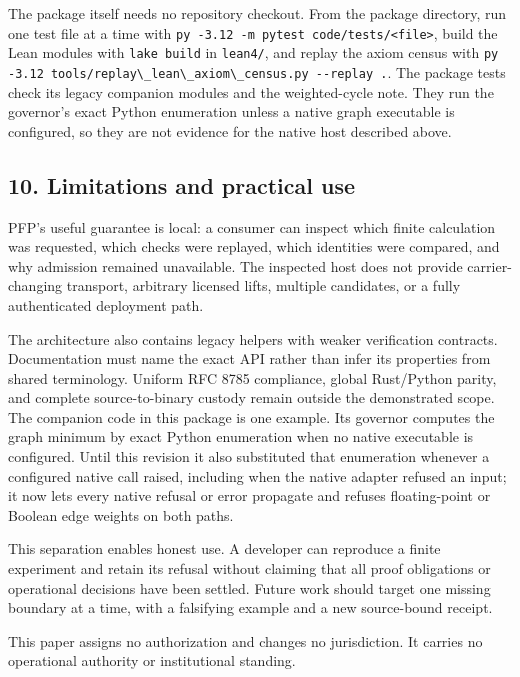 \documentclass[
  11pt,
]{article}
\newcommand{\passthrough}[1]{#1}
\begin{document}
The package itself needs no repository checkout. From the package
directory, run one test file at a time with
\passthrough{\lstinline!py -3.12 -m pytest code/tests/<file>!}, build
the Lean modules with \passthrough{\lstinline!lake build!} in
\passthrough{\lstinline!lean4/!}, and replay the axiom census with
\passthrough{\lstinline!py -3.12 tools/replay\_lean\_axiom\_census.py --replay .!}.
The package tests check its legacy companion modules and the
weighted-cycle note. They run the governor's exact Python enumeration
unless a native graph executable is configured, so they are not evidence
for the native host described above.

\subsection{10. Limitations and practical
use}\label{limitations-and-practical-use}

PFP's useful guarantee is local: a consumer can inspect which finite
calculation was requested, which checks were replayed, which identities
were compared, and why admission remained unavailable. The inspected
host does not provide carrier-changing transport, arbitrary licensed
lifts, multiple candidates, or a fully authenticated deployment path.

The architecture also contains legacy helpers with weaker verification
contracts. Documentation must name the exact API rather than infer its
properties from shared terminology. Uniform RFC 8785 compliance, global
Rust/Python parity, and complete source-to-binary custody remain outside
the demonstrated scope. The companion code in this package is one
example. Its governor computes the graph minimum by exact Python
enumeration when no native executable is configured. Until this revision
it also substituted that enumeration whenever a configured native call
raised, including when the native adapter refused an input; it now lets
every native refusal or error propagate and refuses floating-point or
Boolean edge weights on both paths.

This separation enables honest use. A developer can reproduce a finite
experiment and retain its refusal without claiming that all proof
obligations or operational decisions have been settled. Future work
should target one missing boundary at a time, with a falsifying example
and a new source-bound receipt.

This paper assigns no authorization and changes no jurisdiction. It
carries no operational authority or institutional standing.
\end{document}
